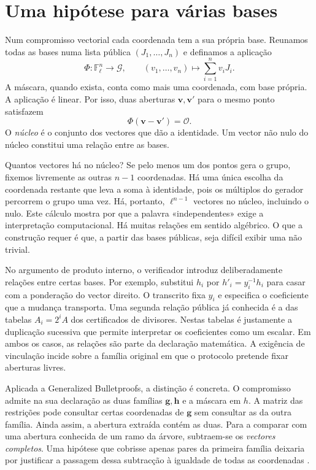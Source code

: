 

\section{Uma hipótese para várias bases}

Num compromisso vectorial cada coordenada tem a sua própria base.
Reunamos todas as bases numa lista pública \((J_1,\ldots,J_n)\) e
definamos a aplicação
\[
 \Phi:\mathbb F_\ell^n\longrightarrow\mathcal G,\qquad
 (v_1,\ldots,v_n)\longmapsto\sum_{i=1}^n v_iJ_i .
\]
A máscara, quando exista, conta como mais uma coordenada, com base
própria. A aplicação é linear. Por isso, duas aberturas
\(\boldsymbol v,\boldsymbol v'\) para o mesmo ponto satisfazem
\[
              \Phi(\boldsymbol v-\boldsymbol v')=\mathcal O.
\]
O \emph{núcleo} é o conjunto dos vectores que dão a identidade.
Um vector não nulo do núcleo constitui uma relação entre as bases.

Quantos vectores há no núcleo? Se pelo menos um dos pontos gera o
grupo, fixemos livremente as outras \(n-1\) coordenadas. Há uma
única escolha da coordenada restante que leva a soma à identidade,
pois os múltiplos do gerador percorrem o grupo uma vez. Há, portanto,
\(\ell^{n-1}\) vectores no núcleo, incluindo o nulo. Este cálculo
mostra por que a palavra «independentes» exige a interpretação
computacional. Há muitas relações em sentido algébrico. O que a
construção requer é que, a partir das bases públicas, seja difícil
exibir uma não trivial.

No argumento de produto interno, o verificador introduz deliberadamente
relações entre certas bases. Por exemplo, substitui \(h_i\) por
\(h'_i=y_i^{-1}h_i\) para casar com a ponderação do vector direito.
O transcrito fixa \(y_i\) e especifica o coeficiente que a mudança
transporta. Uma segunda relação pública já conhecida é a das tabelas
\(A_i=2^iA\) dos certificados de divisores. Nestas tabelas é justamente
a duplicação sucessiva que permite interpretar os coeficientes como
um escalar. Em ambos os casos, as relações são parte da declaração
matemática. A exigência de vinculação incide sobre a família original
em que o protocolo pretende fixar aberturas livres.

Aplicada a Generalized Bulletproofs, a distinção é concreta.
O compromisso admite na sua declaração as duas famílias
\(\boldsymbol g,\boldsymbol h\) e a máscara em \(h\). A matriz das
restrições pode consultar certas coordenadas de \(\boldsymbol g\)
sem consultar as da outra família. Ainda assim, a abertura extraída
contém as duas. Para a comparar com uma abertura conhecida de um ramo
da árvore, subtraem-se os \emph{vectores completos}. Uma hipótese
que cobrisse apenas pares da primeira família deixaria por justificar
a passagem dessa subtracção à igualdade de todas as coordenadas
\cite{generalized-bulletproofs-fixed}.

